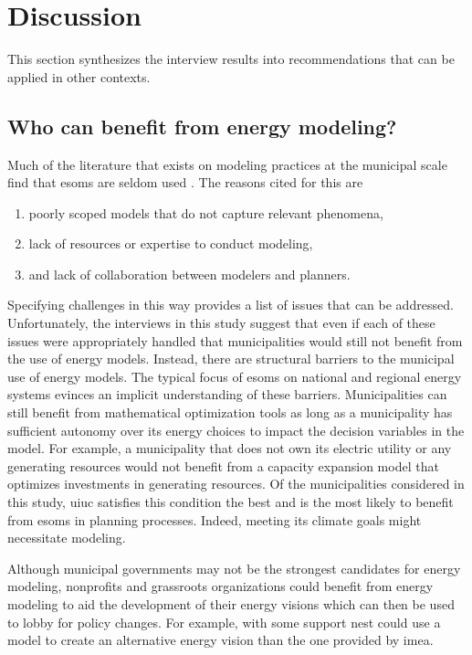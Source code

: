 \section{Discussion}
\label{section:interview-discussion}
This section synthesizes the interview results into recommendations that can be
applied in other contexts.

\subsection{Who can benefit from energy modeling?}
Much of the literature that exists on modeling practices at the municipal scale
find that \acp{esom} are seldom used
\cite{ben_amer_too_2020,johannsen_municipal_2023}. The reasons cited for this
are \cite{ben_amer_too_2020,johannsen_municipal_2023,susser_better_2022}
\begin{enumerate}
    \item poorly scoped models that do not capture relevant phenomena,
    \item lack of resources or expertise to conduct modeling, 
    \item and lack of collaboration between modelers and planners.
\end{enumerate} 
Specifying challenges in this way provides a list of issues that can be
addressed. Unfortunately, the interviews in this study suggest that even if each
of these issues were appropriately handled that municipalities would still not
benefit from the use of energy models. Instead, there are structural barriers to
the municipal use of energy models. The typical focus of \acp{esom} on national
and regional energy systems evinces an implicit understanding of these barriers.
Municipalities can still benefit from mathematical optimization tools as long as
a municipality has sufficient autonomy over its energy choices to impact the
decision variables in the model. For example, a municipality that does not own
its electric utility or any generating resources would not benefit from a
capacity expansion model that optimizes investments in generating resources. Of
the municipalities considered in this study, \ac{uiuc} satisfies this condition
the best and is the most likely to benefit from \acp{esom} in planning
processes. Indeed, meeting its climate goals might necessitate modeling.

Although municipal governments may not be the strongest candidates for energy
modeling, nonprofits and grassroots organizations could benefit from energy
modeling to aid the development of their energy visions which can then be used
to lobby for policy changes. For example, with some support \ac{nest} could use
a model to create an alternative energy vision than the one provided by
\ac{imea}.

